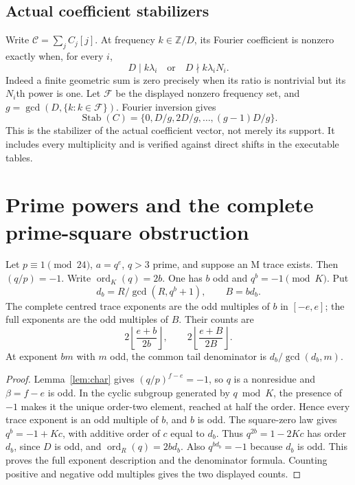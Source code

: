 \subsection{Actual coefficient stabilizers}
Write $\mathcal C=\sum_j C_j[j]$. At frequency $k\in\mathbb Z/D$, its Fourier
coefficient is nonzero exactly when, for every $i$,
\[
 D\mid k\lambda_i
 \quad\text{or}\quad D\nmid k\lambda_iN_i.
\]
Indeed a finite geometric sum is zero precisely when its ratio is nontrivial
but its $N_i$th power is one. Let $\mathcal F$ be the displayed nonzero
frequency set, and $g=\gcd(D,\{k:k\in\mathcal F\})$. Fourier inversion gives
\begin{equation}\label{eq:stabilizer}
 \operatorname{Stab}(C)=\{0,D/g,2D/g,\ldots,(g-1)D/g\}.
\end{equation}
This is the stabilizer of the actual coefficient vector, not merely its
support. It includes every multiplicity and is verified against direct shifts
in the executable tables.

\section{Prime powers and the complete prime-square obstruction}\label{sec:squares}
\begin{proposition}\label{prop:power}
Let $p\equiv1\pmod{24}$, $a=q^e$, $q>3$ prime, and suppose an M trace exists.
Then $(q/p)=-1$. Write $\operatorname{ord}_K(q)=2b$. One has $b$ odd and
$q^b=-1\pmod K$. Put
\[
 d_b=R/\gcd(R,q^b+1),\qquad B=bd_b.
\]
The complete centred trace exponents are the odd multiples of $b$ in $[-e,e]$;
the full exponents are the odd multiples of $B$. Their counts are
\[
 2\left\lfloor\frac{e+b}{2b}\right\rfloor,
 \qquad2\left\lfloor\frac{e+B}{2B}\right\rfloor.
\]
At exponent $bm$ with $m$ odd, the common tail denominator is
$d_b/\gcd(d_b,m)$.
\end{proposition}
\begin{proof}
Lemma~\ref{lem:char} gives $(q/p)^{f-e}=-1$, so $q$ is a nonresidue and
$\beta=f-e$ is odd. In the cyclic subgroup generated by $q\bmod K$, the
presence of $-1$ makes it the unique order-two element, reached at half the
order. Hence every trace exponent is an odd multiple of $b$, and $b$ is odd.
The square-zero law gives $q^b=-1+Kc$, with additive order of $c$ equal to
$d_b$. Thus $q^{2b}=1-2Kc$ has order $d_b$, since $D$ is odd, and
$\operatorname{ord}_R(q)=2bd_b$. Also $q^{bd_b}=-1$ because $d_b$ is odd.
This proves the full exponent description and the denominator formula.
Counting positive and negative odd multiples gives the two displayed counts.
\end{proof}

